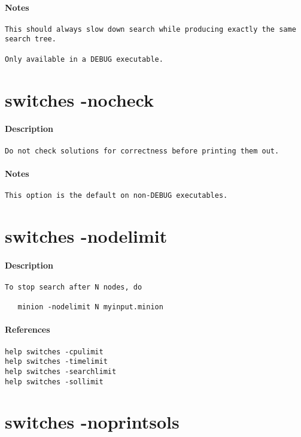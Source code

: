 \paragraph{Notes}
{\footnotesize
\begin{verbatim}
This should always slow down search while producing exactly the same
search tree.

Only available in a DEBUG executable.
\end{verbatim}
}
\section{switches -nocheck}
\paragraph{Description}
{\footnotesize
\begin{verbatim}
Do not check solutions for correctness before printing them out.
\end{verbatim}
}
\paragraph{Notes}
{\footnotesize
\begin{verbatim}
This option is the default on non-DEBUG executables.
\end{verbatim}
}
\section{switches -nodelimit}
\paragraph{Description}
{\footnotesize
\begin{verbatim}
To stop search after N nodes, do

   minion -nodelimit N myinput.minion
\end{verbatim}
}
\paragraph{References}
{\footnotesize
\begin{verbatim}
help switches -cpulimit
help switches -timelimit
help switches -searchlimit
help switches -sollimit
\end{verbatim}
}
\section{switches -noprintsols}
